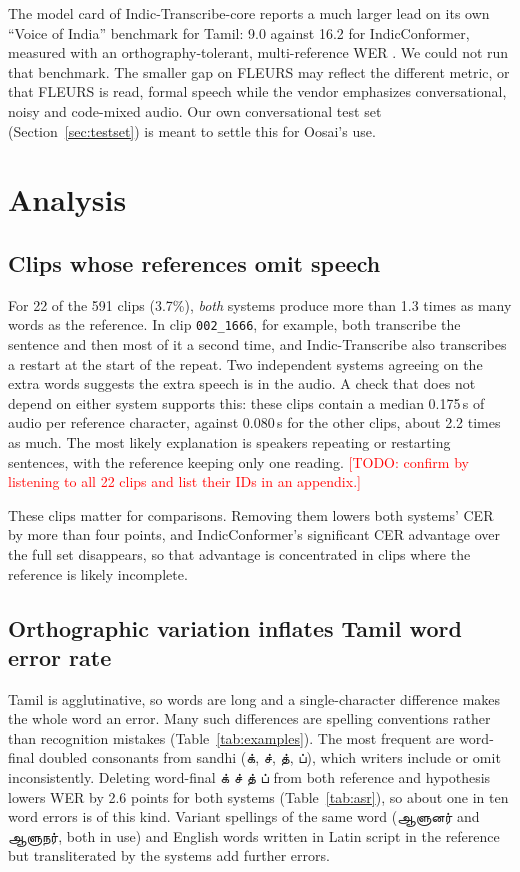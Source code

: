 \documentclass[11pt]{article}
\newcommand{\ta}[1]{{\tamilfont #1}}
\newcommand{\todo}[1]{\textcolor{red}{[TODO: #1]}}
\begin{document}
The model card of Indic-Transcribe-core reports a much larger lead on its own ``Voice of India''
benchmark for Tamil: 9.0 against 16.2 for IndicConformer, measured with an orthography-tolerant,
multi-reference WER \citep{bodhan2026indictranscribe}. We could not run that benchmark. The smaller
gap on FLEURS may reflect the different metric, or that FLEURS is read, formal speech while the
vendor emphasizes conversational, noisy and code-mixed audio. Our own conversational test set
(Section~\ref{sec:testset}) is meant to settle this for Oosai's use.

\section{Analysis}
\label{sec:analysis}

\subsection{Clips whose references omit speech}
\label{sec:suspect}

For 22 of the 591 clips (3.7\%), \emph{both} systems produce more than 1.3 times as many words as the
reference. In clip \texttt{002\_1666}, for example, both transcribe the sentence and then most of it a
second time, and Indic-Transcribe also transcribes a restart at the start of the repeat. Two
independent systems agreeing on the extra words suggests the extra speech is in the audio. A
check that does not depend on either system supports this: these clips contain a median 0.175\,s of
audio per reference character, against 0.080\,s for the other clips, about 2.2 times as much. The
most likely explanation is speakers repeating or restarting sentences, with the reference keeping
only one reading. \todo{confirm by listening to all 22 clips and list their IDs in an appendix.}

These clips matter for comparisons. Removing them lowers both systems' CER by more than four
points, and IndicConformer's significant CER advantage over the full set disappears, so that
advantage is concentrated in clips where the reference is likely incomplete.

\subsection{Orthographic variation inflates Tamil word error rate}

Tamil is agglutinative, so words are long and a single-character difference makes the whole word an
error. Many such differences are spelling conventions rather than recognition mistakes
(Table~\ref{tab:examples}). The most frequent are word-final doubled consonants from sandhi
(\ta{க்}, \ta{ச்}, \ta{த்}, \ta{ப்}), which writers include or omit inconsistently. Deleting
word-final \ta{க் ச் த் ப்} from both reference and hypothesis lowers WER by 2.6 points for both
systems (Table~\ref{tab:asr}), so about one in ten word errors is of this kind. Variant spellings of
the same word (\ta{ஆளுனர்} and \ta{ஆளுநர்}, both in use) and English words written in Latin script in
the reference but transliterated by the systems add further errors.
\end{document}
